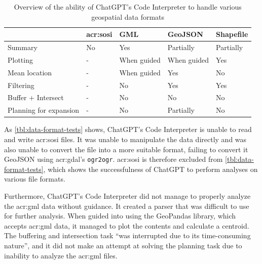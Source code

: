 \begin{table}
    \centering
    \begin{tabular}{l|p{}p{}p{}p{}}
        \toprule
                               & \textbf{\acrshort{acr:sosi}} & \textbf{GML} & \textbf{GeoJSON} & \textbf{Shapefile} \\
        \midrule
        Summary                & No                           & Yes          & Partially        & Partially          \\
        Plotting               & -                            & When guided  & When guided      & Yes                \\
        Mean location          & -                            & When guided  & Yes              & No                 \\
        Filtering              & -                            & No           & Yes              & Yes                \\
        Buffer + Intersect     & -                            & No           & No               & No                 \\
        Planning for expansion & -                            & No           & Partially        & No                 \\
        \bottomrule
    \end{tabular}
    \caption{Overview of the ability of ChatGPT's Code Interpreter to handle various geospatial data formats}
    \label{tbl:data-format-tests}
\end{table}

As \autoref{tbl:data-format-tests} shows, ChatGPT's Code Interpreter is unable to read and write \acrshort{acr:sosi} files. It was unable to manipulate the data directly and was also unable to convert the file into a more suitable format, failing to convert it GeoJSON using \acrshort{acr:gdal}'s \texttt{ogr2ogr}. \acrshort{acr:sosi} is therefore excluded from \autoref{tbl:data-format-tests}, which shows the successfulness of ChatGPT to perform analyses on various file formats.

Furthermore, ChatGPT's Code Interpreter did not manage to properly analyze the \acrshort{acr:gml} data without guidance. It created a parser that was difficult to use for further analysis. When guided into using the GeoPandas library, which accepts \acrshort{acr:gml} data, it managed to plot the contents and calculate a centroid. The buffering and intersection task \enquote{was interrupted due to its time-consuming nature}, and it did not make an attempt at solving the planning task due to inability to analyze the \acrshort{acr:gml} files.

